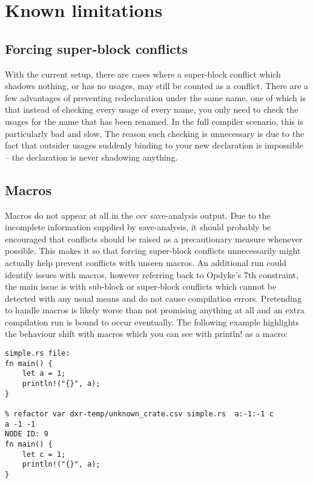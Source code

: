 \section{Known limitations}\label{S:limit}
\subsection{Forcing super-block conflicts}
With the current setup, there are cases where a super-block conflict which shadows nothing, or has no usages, may still be counted as a conflict. There are a few advantages of preventing redeclaration under the same name, one of which is that instead of checking every usage of every name, you only need to check the usages for the name that has been renamed. In the full compiler scenario, this is particularly bad and slow. The reason such checking is unnecessary is due to the fact that outsider usages suddenly binding to your new declaration is impossible -- the declaration is never shadowing anything.

\subsection{Macros}
Macros do not appear at all in the csv save-analysis output. Due to the incomplete information supplied by save-analysis, it should probably be encouraged that conflicts should be raised as a precautionary measure whenever possible. This makes it so that forcing super-block conflicts unnecessarily might actually help prevent conflicts with unseen macros. An additional run could identify issues with macros, however referring back to Opdyke's 7th constraint, the main issue is with sub-block or super-block conflicts which cannot be detected with any usual means and do not cause compilation errors. Pretending to handle macros is likely worse than not promising anything at all and an extra compilation run is bound to occur eventually. The following example highlights the behaviour shift with macros which you can see with println! as a macro:


\begin{verbatim}
simple.rs file:
fn main() {
    let a = 1;
    println!("{}", a);
}

% refactor var dxr-temp/unknown_crate.csv simple.rs  a:-1:-1 c
a -1 -1
NODE ID: 9
fn main() {
    let c = 1;
    println!("{}", a);
}
\end{verbatim}

